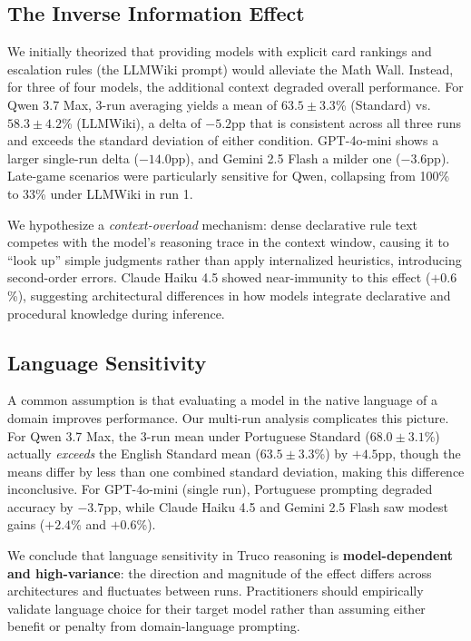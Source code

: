 \documentclass[11pt]{article}
\begin{document}
\subsection{The Inverse Information Effect}
\label{sec:iie}

We initially theorized that providing models with explicit card rankings and escalation rules (the LLMWiki prompt) would alleviate the Math Wall. Instead, for three of four models, the additional context degraded overall performance. For Qwen 3.7 Max, 3-run averaging yields a mean of $63.5 \pm 3.3$\% (Standard) vs.\ $58.3 \pm 4.2$\% (LLMWiki), a delta of $-5.2$pp that is consistent across all three runs and exceeds the standard deviation of either condition. GPT-4o-mini shows a larger single-run delta ($-14.0$pp), and Gemini 2.5 Flash a milder one ($-3.6$pp). Late-game scenarios were particularly sensitive for Qwen, collapsing from 100\% to 33\% under LLMWiki in run 1.

We hypothesize a \textit{context-overload} mechanism: dense declarative rule text competes with the model's reasoning trace in the context window, causing it to ``look up'' simple judgments rather than apply internalized heuristics, introducing second-order errors. Claude Haiku 4.5 showed near-immunity to this effect ($+0.6$\%), suggesting architectural differences in how models integrate declarative and procedural knowledge during inference.

\subsection{Language Sensitivity}
\label{sec:langpenalty}

A common assumption is that evaluating a model in the native language of a domain improves performance. Our multi-run analysis complicates this picture. For Qwen 3.7 Max, the 3-run mean under Portuguese Standard ($68.0 \pm 3.1$\%) actually \textit{exceeds} the English Standard mean ($63.5 \pm 3.3$\%) by $+4.5$pp, though the means differ by less than one combined standard deviation, making this difference inconclusive. For GPT-4o-mini (single run), Portuguese prompting degraded accuracy by $-3.7$pp, while Claude Haiku 4.5 and Gemini 2.5 Flash saw modest gains ($+2.4$\% and $+0.6$\%).

We conclude that language sensitivity in Truco reasoning is \textbf{model-dependent and high-variance}: the direction and magnitude of the effect differs across architectures and fluctuates between runs. Practitioners should empirically validate language choice for their target model rather than assuming either benefit or penalty from domain-language prompting.
\end{document}
